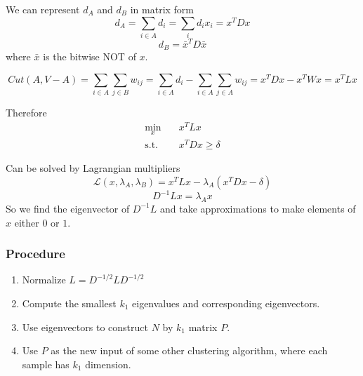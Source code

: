         We can represent $d_A$ and $d_B$ in matrix form
        \[ d_A = \sum_{i\in A}d_i = \sum_i d_ix_i = x^TDx \]
        \[ d_B = \bar{x}^TD\bar{x} \]
        where $\bar{x}$ is the bitwise NOT of $x$.

        \[ Cut(A, V-A) = \sum_{i\in A}\sum_{j\in B}w_{ij} = \sum_{i \in A}d_i - \sum_{i \in A}\sum_{j \in A}w_{ij} = x^TDx - x^TWx = x^TLx \]

        Therefore
        \begin{align*}
            \min_x &\quad x^TLx\\
            \text{s.t.} &\quad x^TDx \ge \delta
        \end{align*}

        Can be solved by Lagrangian multipliers
        \[ \mathcal{L}(x, \lambda_A, \lambda_B) = x^TLx - \lambda_A(x^TDx-\delta) \]
        \[ D^{-1}Lx = \lambda_A x \]
        So we find the eigenvector of $D^{-1}L$ and take approximations to make elements of $x$ either $0$ or $1$.

        \subsubsection{Procedure}
            \begin{enumerate}
                \item Normalize $L = D^{-1/2}LD^{-1/2}$
                \item Compute the smallest $k_1$ eigenvalues and corresponding eigenvectors.
                \item Use eigenvectors to construct $N$ by $k_1$ matrix $P$.
                \item Use $P$ as the new input of some other clustering algorithm, where each sample has $k_1$ dimension.
            \end{enumerate}
